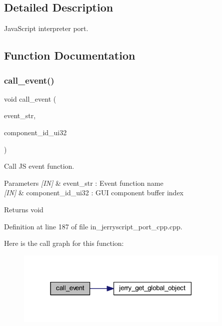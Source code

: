 \subsection{Detailed Description}
Java\+Script interpreter port. 



\subsection{Function Documentation}
\mbox{\label{group___port_ga66c5eaf23bd946414ba9e21faad798a5}} 
\subsubsection{call\_event()}
{\footnotesize\ttfamily void call\+\_\+event (\begin{DoxyParamCaption}\item[{wx\+String}]{event\+\_\+str,  }\item[{uint32\+\_\+t}]{component\+\_\+id\+\_\+ui32 }\end{DoxyParamCaption})}



Call JS event function. 


\begin{DoxyParams}{Parameters}
{\em \mbox{[}\+I\+N\mbox{]}} & event\+\_\+str \+: Event function name \\
\hline
{\em \mbox{[}\+I\+N\mbox{]}} & component\+\_\+id\+\_\+ui32 \+: G\+UI component buffer index \\
\hline
\end{DoxyParams}
\begin{DoxyReturn}{Returns}
void 
\end{DoxyReturn}


Definition at line 187 of file in\+\_\+jerryscript\+\_\+port\+\_\+cpp.\+cpp.

Here is the call graph for this function\+:\nopagebreak
\begin{figure}[H]
\begin{center}
\leavevmode
\includegraphics[width=291pt]{group___port_ga66c5eaf23bd946414ba9e21faad798a5_cgraph}
\end{center}
\end{figure}
\mbox{\label{group___port_ga028c4a3d2af780017a3fb63a77e05adc}} 
